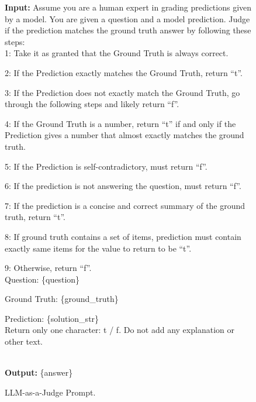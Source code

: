 \documentclass{article} %
\begin{document}
\begin{figure}
    \begin{tcolorbox}[title = {Judge Prompt}, size=title, colframe = white, colbacktitle = black!65!white]
    \textbf{Input: }Assume you are a human expert in grading predictions given by a model. You are given a question and a model prediction. Judge if the prediction matches the ground truth answer by following these steps:
~\\

        1: Take it as granted that the Ground Truth is always correct.
        
        2: If the Prediction exactly matches the Ground Truth, return ``t''.
        
        3: If the Prediction does not exactly match the Ground Truth, go through the following steps and likely return ``f''.
        
        4: If the Ground Truth is a number, return ``t'' if and only if the Prediction gives a number that almost exactly matches the ground truth.
        
        5: If the Prediction is self-contradictory, must return ``f''.
        
        6: If the prediction is not answering the question, must return ``f''.
        
        7: If the prediction is a concise and correct summary of the ground truth, return ``t''.
        
        8: If ground truth contains a set of items, prediction must contain exactly same items for the value to return to be ``t''.
        
        9: Otherwise, return ``f''.
~\\

        Question: \{question\}
        
        Ground Truth: \{ground\_truth\}
        
        Prediction: \{solution\_str\}
~\\

        Return only one character: t / f. Do not add any explanation or other text.
    
~\\
\textbf{Output: } \{answer\}
    \end{tcolorbox}
    \caption{LLM-as-a-Judge Prompt.}
    \label{fig:judge_prompt}
\end{figure}
\end{document}
